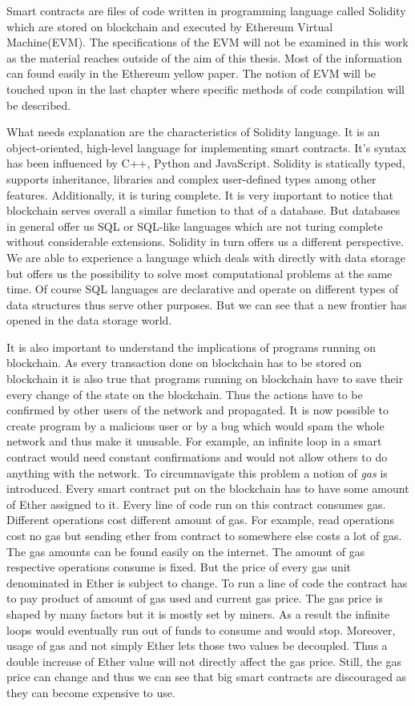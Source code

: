 \documentclass[a4paper,12pt,twoside,openany]{report}
\begin{document}
Smart contracts are files of code written in programming language called Solidity which are stored on blockchain and executed by Ethereum Virtual Machine(EVM). The specifications of the EVM will not be examined in this work as the material reaches outside of the aim of this thesis. Most of the information can found easily in the Ethereum yellow paper. \cite{ethyellow} The notion of EVM will be touched upon in the last chapter where specific methods of code compilation will be described.

What needs explanation are the characteristics of Solidity language. It is an object-oriented, high-level language for implementing smart contracts. It's syntax has been influenced by C++, Python and JavaScript. Solidity is statically typed, supports inheritance, libraries and complex user-defined types among other features. Additionally, it is turing complete. It is very important to notice that blockchain serves overall a similar function to that of a database. But databases in general offer us SQL or SQL-like languages which are not turing complete without considerable extensions. Solidity in turn offers us a different perspective. We are able to experience a language which deals with directly with data storage but offers us the possibility to solve most computational problems at the same time. Of course SQL languages are declarative and operate on different types of data structures thus serve other purposes. But we can see that a new frontier has opened in the data storage world.

It is also important to understand the implications of programs running on blockchain. As every transaction done on blockchain has to be stored on blockchain it is also true that programs running on blockchain have to save their every change of the state on the blockchain. Thus the actions have to be confirmed by other users of the network and propagated. It is now possible to create program by a malicious user or by a bug which would spam the whole network and thus make it unusable. For example, an infinite loop in a smart contract would need constant confirmations and would not allow others to do anything with the network. To circumnavigate this problem a notion of \textit{gas} is introduced. Every smart contract put on the blockchain has to have some amount of Ether assigned to it. Every line of code run on this contract consumes gas. Different operations cost different amount of gas. For example, read operations cost no gas but sending ether from contract to somewhere else costs a lot of gas. The gas amounts can be found easily on the internet. \cite{gas} The amount of gas respective operations consume is fixed. But the price of every gas unit denominated in Ether is subject to change. To run a line of code the contract has to pay product of amount of gas used and current gas price. The gas price is shaped by many factors but it is mostly set by miners. As a result the infinite loops would eventually run out of funds to consume and would stop. Moreover, usage of gas and not simply Ether lets those two values be decoupled. Thus a double increase of Ether value will not directly affect the gas price. Still, the gas price can change and thus we can see that big smart contracts are discouraged as they can become expensive to use. 
\end{document}

